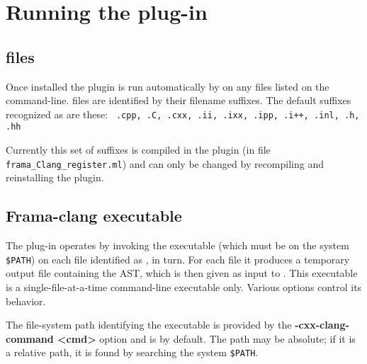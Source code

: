 \chapter{Running the plug-in}

\section{\cpp files}
Once installed the plugin is run automatically by \framac on any \cpp files listed on the command-line. \cpp files are identified by their filename suffixes. The default suffixes recognized as \cpp are these:
\lstinline| .cpp, .C, .cxx, .ii, .ixx, .ipp, .i++, .inl, .h, .hh|

Currently this set of suffixes is compiled in the plugin (in file \texttt{frama\_Clang\_register.ml}) and can only be changed by recompiling and
reinstalling the plugin.

\section{Frama-clang executable}
The plug-in operates by invoking the executable \irg (which must be on the system \verb|$PATH|)
on each file identified as \cpp, in turn. 
For each file it produces a temporary output file containing the \C AST, which is then given as input to \framac. 
This executable is a single-file-at-a-time command-line executable only. 
Various options control its behavior.

The file-system path identifying the executable is provided by the \textbf{-cxx-clang-command <cmd>}
option and is \irg by default. The path may be absolute; if it is a relative path, it is found by searching the system \verb|$PATH|.

